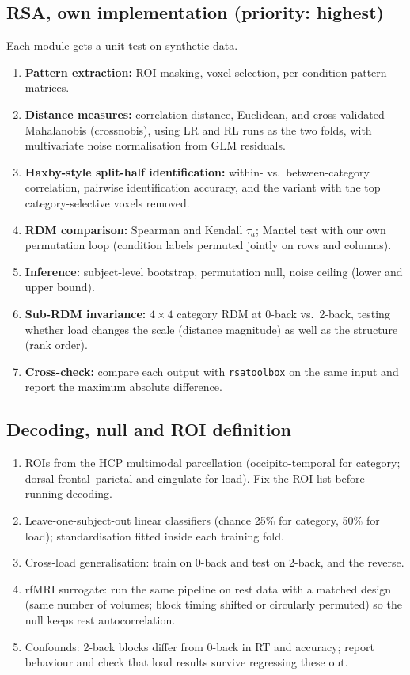 \documentclass[11pt,a4paper]{article}
\begin{document}
\subsection{RSA, own implementation (priority: highest)}
\label{sec:rsa}
Each module gets a unit test on synthetic data.
\begin{enumerate}
\item \textbf{Pattern extraction:} ROI masking, voxel selection, per-condition pattern matrices.
\item \textbf{Distance measures:} correlation distance, Euclidean, and cross-validated Mahalanobis (crossnobis), using LR and RL runs as the two folds, with multivariate noise normalisation from GLM residuals.
\item \textbf{Haxby-style split-half identification:} within- vs.\ between-category correlation, pairwise identification accuracy, and the variant with the top category-selective voxels removed.
\item \textbf{RDM comparison:} Spearman and Kendall $\tau_a$; Mantel test with our own permutation loop (condition labels permuted jointly on rows and columns).
\item \textbf{Inference:} subject-level bootstrap, permutation null, noise ceiling (lower and upper bound).
\item \textbf{Sub-RDM invariance:} $4\times4$ category RDM at 0-back vs.\ 2-back, testing whether load changes the scale (distance magnitude) as well as the structure (rank order).
\item \textbf{Cross-check:} compare each output with \texttt{rsatoolbox} on the same input and report the maximum absolute difference.
\end{enumerate}

\subsection{Decoding, null and ROI definition}
\begin{enumerate}
\item ROIs from the HCP multimodal parcellation (occipito-temporal for category; dorsal frontal--parietal and cingulate for load). Fix the ROI list before running decoding.
\item Leave-one-subject-out linear classifiers (chance 25\% for category, 50\% for load); standardisation fitted inside each training fold.
\item Cross-load generalisation: train on 0-back and test on 2-back, and the reverse.
\item rfMRI surrogate: run the same pipeline on rest data with a matched design (same number of volumes; block timing shifted or circularly permuted) so the null keeps rest autocorrelation.
\item Confounds: 2-back blocks differ from 0-back in RT and accuracy; report behaviour and check that load results survive regressing these out.
\end{enumerate}
\end{document}
